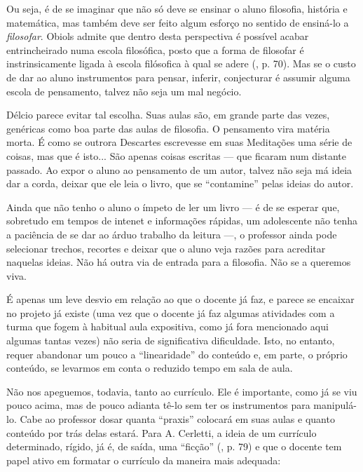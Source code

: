 \documentclass[12pt,a4paper]{article}
\begin{document}
	Ou seja, é de se imaginar que não só deve se ensinar o aluno filosofia, 
	história e matemática, mas também deve ser feito algum esforço no sentido 
	de ensiná-lo a \textit{filosofar}. Obiols admite que dentro desta 
	perspectiva é possível acabar entrincheirado numa escola filosófica, posto 
	que a forma de filosofar é instrinsicamente ligada à escola filósofica à 
	qual se adere (\cite{obiols}, p. 70). Mas se o custo de dar ao aluno 
	instrumentos para pensar, inferir, conjecturar é assumir alguma escola 
	de pensamento, talvez não seja um mal negócio. 
	
	Délcio parece evitar tal escolha. Suas aulas são, em grande parte das 
	vezes, genéricas como boa parte das aulas de filosofia. O pensamento 
	vira matéria morta. É como se outrora Descartes escrevesse em suas 
	Meditações uma série de coisas, mas que é isto... São apenas coisas 
	escritas --- que ficaram num distante passado. Ao expor o aluno ao 
	pensamento de um autor, talvez não seja má ideia dar a corda, deixar 
	que ele leia o livro, que se ``contamine'' pelas ideias do autor. 
	
	Ainda que não tenho o aluno o ímpeto de ler um livro --- é de se 
	esperar que, sobretudo em tempos de intenet e informações rápidas, 
	um adolescente não tenha a paciência de se dar ao árduo trabalho da 
	leitura ---, o professor ainda pode selecionar trechos, recortes 
	e deixar que o aluno veja razões para acreditar naquelas ideias. 
	Não há outra via de entrada para a filosofia. Não se a queremos viva. 
	
	É apenas um leve desvio em relação ao que o docente já faz, e parece 
	se encaixar no projeto já existe (uma vez que o docente já faz algumas 
	atividades com a turma que fogem à habitual aula expositiva, como já 
	fora mencionado aqui algumas tantas vezes) não seria de significativa 
	dificuldade. Isto, no entanto, requer abandonar um pouco a ``linearidade'' 
	do conteúdo e, em parte, o próprio conteúdo, se levarmos em conta o 
	reduzido tempo em sala de aula. 
	
	Não nos apeguemos, todavia, tanto ao currículo. Ele é importante, como 
	já se viu pouco acima, mas de pouco adianta tê-lo sem ter os 
	instrumentos para manipulá-lo. Cabe ao professor dosar quanta ``praxis'' 
	colocará em suas aulas e quanto conteúdo por trás delas estará. 	
	Para A. Cerletti, a ideia de um currículo determinado, rígido, já é, 
	de saída, uma ``ficção'' (\cite{cerletti}, p. 79) e que o docente tem 
	papel ativo em formatar o currículo da maneira mais adequada: 
	
\end{document}
